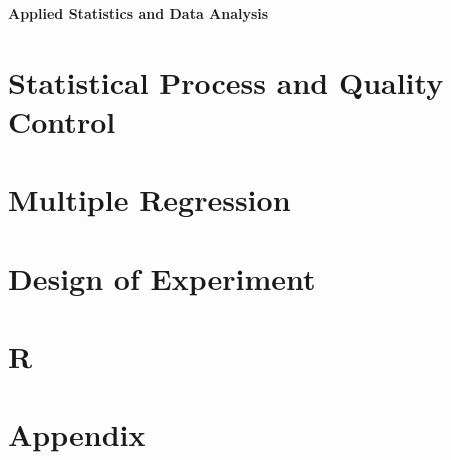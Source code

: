 \documentclass[10pt]{article}
\begin{document}
\footnotesize

\begin{center}
\Large{\textbf{Applied Statistics and Data Analysis}} \\
\end{center}
\begin{multicols*}{2}
\setlength{\premulticols}{1pt}
\setlength{\postmulticols}{1pt}
\setlength{\multicolsep}{1pt}
\setlength{\columnsep}{2pt}


\part{Statistical Process and Quality Control}






\part{Multiple Regression}






\part{Design of Experiment}





\part{R}




\newpage

\part*{Appendix}


\end{multicols*}
\end{document}
